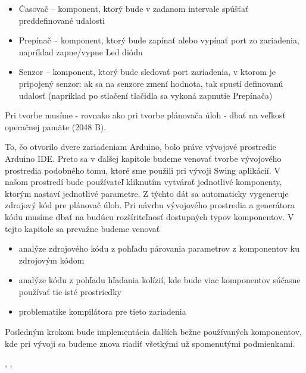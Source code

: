\begin{itemize}
\item Časovač – komponent, ktorý bude v zadanom intervale spúšťať preddefinované udalosti
\item Prepínač – komponent, ktorý bude zapínať alebo vypínať port zo zariadenia, napríklad zapne/vypne Led diódu
\item Senzor – komponent, ktorý bude sledovať port zariadenia, v ktorom je pripojený senzor: ak sa na senzore zmení hodnota, tak spustí definovanú udalosť (napríklad po stlačení tlačidla sa vykoná zapnutie Prepínača)
\end{itemize}

Pri tvorbe musíme - rovnako ako pri tvorbe plánovača úloh -  dbať na veľkosť operačnej pamäte (2048 B). 

To, čo otvorilo dvere zariadeniam Arduino, bolo práve vývojové prostredie Arduino IDE. Preto sa v ďalšej kapitole budeme venovať tvorbe vývojového prostredia podobného tomu, ktoré sme použili pri vývoji Swing aplikácií. V našom prostredí bude používateľ kliknutím vytvárať jednotlivé komponenty, ktorým nastaví jednotlivé parametre. Z týchto dát sa automaticky vygeneruje zdrojový kód pre plánovač úloh. Pri návrhu vývojového prostredia a generátora kódu musíme dbať na budúcu rozšíriteľnosť dostupných typov komponentov. V tejto kapitole sa prevažne budeme venovať 


\begin{itemize}
\item analýze zdrojového kódu z pohľadu párovania parametrov z komponentov ku zdrojovým kódom
\item analýze kódu z pohľadu hľadania kolízií, kde bude viac komponentov súčasne používať tie isté prostriedky
\item problematike kompilátora pre tieto zariadenia
\end{itemize}

Posledným krokom bude implementácia ďalších bežne používaných komponentov, kde pri vývoji sa budeme znova riadiť všetkými už spomenutými podmienkami.

\cite{iot1}, \cite{iot2}, \cite{iot3}